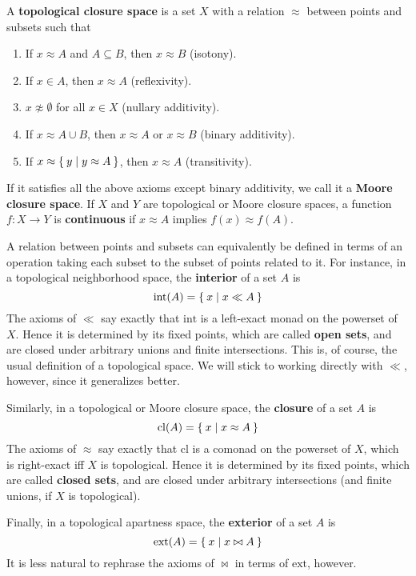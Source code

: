\documentclass{article}
\def\napprox{\not\approx}
\def\int{\mathrm{int}}
\def\ext{\mathrm{ext}}
\def\cl{\mathrm{cl}}
\begin{document}
\begin{defn}
  A \textbf{topological closure space} is a set $X$ with a relation $\approx$ between points and subsets such that
  \begin{enumerate}
  \item If $x\approx A$ and $A\subseteq B$, then $x\approx B$ (isotony).
  \item If $x\in A$, then $x\approx A$ (reflexivity).
  \item $x\napprox \emptyset$ for all $x\in X$ (nullary additivity).
  \item If $x\approx A\cup B$, then $x\approx A$ or $x\approx B$ (binary additivity).
  \item If $x\approx \Set{ y | y\approx A}$, then $x\approx A$ (transitivity).
  \end{enumerate}
  If it satisfies all the above axioms except binary additivity, we call it a \textbf{Moore closure space}.
  If $X$ and $Y$ are topological or Moore closure spaces, a function $f:X\to Y$ is \textbf{continuous} if $x\approx A$ implies $f(x) \approx f(A)$.
\end{defn}

A relation between points and subsets can equivalently be defined in terms of an operation taking each subset to the subset of points related to it.
For instance, in a topological neighborhood space, the \textbf{interior} of a set $A$ is
\[ \int(A) = \setof{ x | x\ll A } \]
The axioms of $\ll$ say exactly that $\int$ is a left-exact monad on the powerset of $X$.
Hence it is determined by its fixed points, which are called \textbf{open sets}, and are closed under arbitrary unions and finite intersections.
This is, of course, the usual definition of a topological space.
We will stick to working directly with $\ll$, however, since it generalizes better.

Similarly, in a topological or Moore closure space, the \textbf{closure} of a set $A$ is
\[ \cl(A) = \setof{x | x \approx A } \]
The axioms of $\approx$ say exactly that $\cl$ is a comonad on the powerset of $X$, which is right-exact iff $X$ is topological.
Hence it is determined by its fixed points, which are called \textbf{closed sets}, and are closed under arbitrary intersections (and finite unions, if $X$ is topological).

Finally, in a topological apartness space, the \textbf{exterior} of a set $A$ is
\[ \ext(A) = \setof{ x | x\bowtie A } \]
It is less natural to rephrase the axioms of $\bowtie$ in terms of $\ext$, however.
\end{document}
